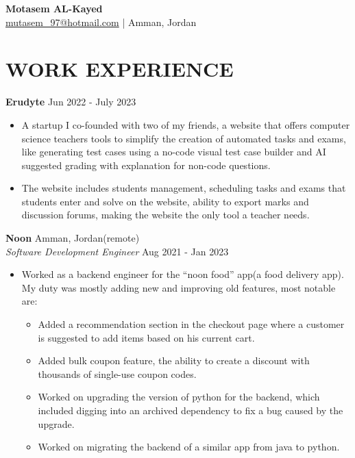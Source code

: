 \documentclass[a4paper,13pt]{extarticle}
\begin{document}
\pagestyle{empty}

\begin{center}
\textbf{\Large Motasem AL-Kayed}\\[2pt] %
\href{mailto:mutasem_97@hotmail.com}{mutasem\_97@hotmail.com} | Amman, Jordan
\end{center}

\section*{WORK EXPERIENCE}
\textbf{Erudyte} \hfill Jun 2022 - July 2023 %
\begin{itemize}
	\item A startup I co-founded with two of my friends, a website that offers computer science teachers tools to simplify the creation of automated tasks and exams, like generating test cases using a no-code visual test case builder and AI suggested grading with explanation for non-code questions.
	\item The website includes students management, scheduling tasks and exams that students enter and solve on the website, ability to export marks and discussion forums, making the website the only tool a teacher needs.
		
\end{itemize}

\noindent
\textbf{Noon} \hfill Amman, Jordan(remote)\\ %
\textit{Software Development Engineer} \hfill Aug 2021 - Jan 2023 %
\begin{itemize}
	\item Worked as a backend engineer for the ``noon food'' app(a food delivery app). My duty was mostly adding new and improving old features, most notable are: %
		\begin{itemize}
			\item Added a recommendation section in the checkout page where a customer is suggested to add items based on his current cart.
			\item Added bulk coupon feature, the ability to create a discount with thousands of single-use coupon codes.
			\item Worked on upgrading the version of python for the backend, which included digging into an archived dependency to fix a bug caused by the upgrade.
			\item Worked on migrating the backend of a similar app from java to python.
		\end{itemize}
\end{itemize}
\end{document}
